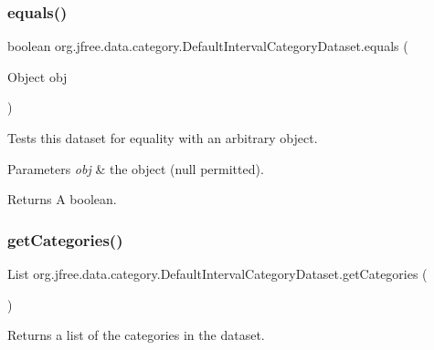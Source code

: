 \subsubsection{\texorpdfstring{equals()}{equals()}}
{\footnotesize\ttfamily boolean org.\+jfree.\+data.\+category.\+Default\+Interval\+Category\+Dataset.\+equals (\begin{DoxyParamCaption}\item[{Object}]{obj }\end{DoxyParamCaption})}

Tests this dataset for equality with an arbitrary object.


\begin{DoxyParams}{Parameters}
{\em obj} & the object ({\ttfamily null} permitted).\\
\hline
\end{DoxyParams}
\begin{DoxyReturn}{Returns}
A boolean. 
\end{DoxyReturn}
\mbox{\label{classorg_1_1jfree_1_1data_1_1category_1_1_default_interval_category_dataset_abd3e0af9301697643c6e2fdde8765c57}} 
\subsubsection{\texorpdfstring{get\+Categories()}{getCategories()}}
{\footnotesize\ttfamily List org.\+jfree.\+data.\+category.\+Default\+Interval\+Category\+Dataset.\+get\+Categories (\begin{DoxyParamCaption}{ }\end{DoxyParamCaption})}

Returns a list of the categories in the dataset.

